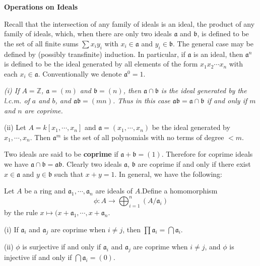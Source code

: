 \begin{center}
\begin{large}
    \textbf{Operations on Ideals}
\end{large}
\end{center}
Recall that the intersection of any family of ideals is an ideal, the product of any family of ideals, which, when there are only two ideals $\mathfrak{a}$ and $\mathfrak{b}$, is defined to be the set of all finite sums $\sum x_iy_i$ with $x_i\in\mathfrak{a}$ and $y_i\in\mathfrak{b}$. The general case may be defined by (possibly transfinite) induction. In particular, if $\mathfrak{a}$ is an ideal, then $\mathfrak{a}^n$ is defined to be the ideal generated by all elements of the form $x_1x_2\cdots x_n$ with each $x_i\in\mathfrak{a}$. Conventionally we denote $\mathfrak{a}^0=1$.
\begin{example}\em
(i) If $A=\mathbb{Z}$, $\mathfrak{a}=(m)$ and $\mathfrak{b}=(n)$, then $\mathfrak{a}\cap\mathfrak{b}$ is the ideal generated by the l.c.m. of $a$ and $b$, and $\mathfrak{a}\mathfrak{b}=(mn)$. Thus in this case $\mathfrak{a}\mathfrak{b}=\mathfrak{a}\cap\mathfrak{b}$ if and only if $m$ and $n$ are coprime.\par
(ii) Let $A=k[x_1,\cdots,x_n]$ and $\mathfrak{a}=(x_1,\cdots,x_n)$ be the ideal generated by $x_1,\cdots,x_n$. Then $\mathfrak{a}^m$ is the set of all polynomials with no terms of degree $<m$.
\end{example}
Two ideals are said to be \textbf{coprime} if $\mathfrak{a}+\mathfrak{b}=(1)$. Therefore for coprime ideals we have $\mathfrak{a}\cap\mathfrak{b}=\mathfrak{a}\mathfrak{b}$. Clearly two ideals $\mathfrak{a}$, $\mathfrak{b}$ are coprime if and only if there exist $x\in\mathfrak{a}$ and $y\in\mathfrak{b}$ such that $x+y=1$. In general, we have the following: 
\begin{proposition}
Let $A$ be a ring and $\mathfrak{a}_1,\cdots,\mathfrak{a}_n$ are ideals of $A$.Define a homomorphism 
$$
\phi :A\rightarrow \bigoplus_{i=1}^n{\left( A/\mathfrak{a} _i \right)}
$$
by the rule $x\mapsto (x+\mathfrak{a}_1,\cdots,x+\mathfrak{a}_n$.\par
(i) If $\mathfrak{a}_i$ and $\mathfrak{a}_j$ are coprime when $i\ne j$, then $\prod\mathfrak{a}_i=\bigcap\mathfrak{a}_i$.\par
(ii) $\phi$ is surjective if and only if $\mathfrak{a}_i$ and $\mathfrak{a}_j$ are coprime when $i\ne j$, and $\phi$ is injective if and only if $\bigcap\mathfrak{a}_i=(0)$.
\end{proposition}
